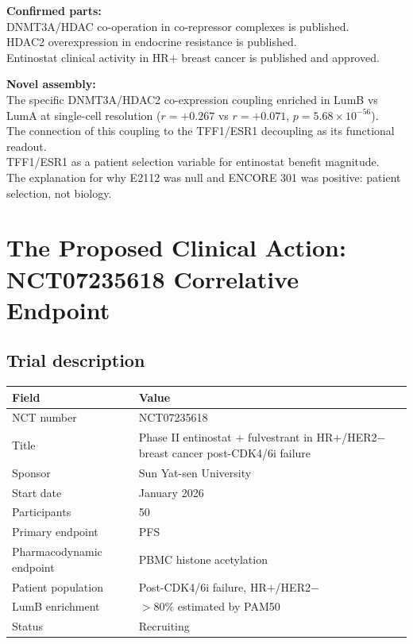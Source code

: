 \documentclass[12pt, a4paper]{article}
\begin{document}
\begin{center}
\colorbox{novelbox}{
\begin{minipage}{0.85\textwidth}
\vspace{0.5em}
\textbf{Confirmed parts:}\\
DNMT3A/HDAC co-operation in co-repressor
complexes is published.\\
HDAC2 overexpression in endocrine resistance is
published.\\
Entinostat clinical activity in HR$+$ breast cancer
is published and approved.

\medskip
\textbf{Novel assembly:}\\
The specific DNMT3A/HDAC2 co-expression coupling
enriched in LumB vs LumA at single-cell resolution
($r=+0.267$ vs $r=+0.071$, $p=5.68\times10^{-56}$).\\
The connection of this coupling to the TFF1/ESR1
decoupling as its functional readout.\\
TFF1/ESR1 as a patient selection variable for
entinostat benefit magnitude.\\
The explanation for why E2112 was null and ENCORE
301 was positive: patient selection, not biology.
\vspace{0.4em}
\end{minipage}
}
\end{center}

\section{The Proposed Clinical Action: NCT07235618
Correlative Endpoint}

\subsection{Trial description}

\begin{center}
\begin{tabular}{ll}
\toprule
\textbf{Field} & \textbf{Value} \\
\midrule
NCT number
& NCT07235618 \\
Title
& Phase II entinostat $+$ fulvestrant in HR$+$/HER2$-$
  breast cancer post-CDK4/6i failure \\
Sponsor
& Sun Yat-sen University \\
Start date
& January 2026 \\
Participants
& 50 \\
Primary endpoint
& PFS \\
Pharmacodynamic endpoint
& PBMC histone acetylation \\
Patient population
& Post-CDK4/6i failure, HR$+$/HER2$-$\\
LumB enrichment
& $>80\%$ estimated by PAM50 \\
Status
& Recruiting \\
\bottomrule
\end{tabular}
\end{center}
\end{document}
